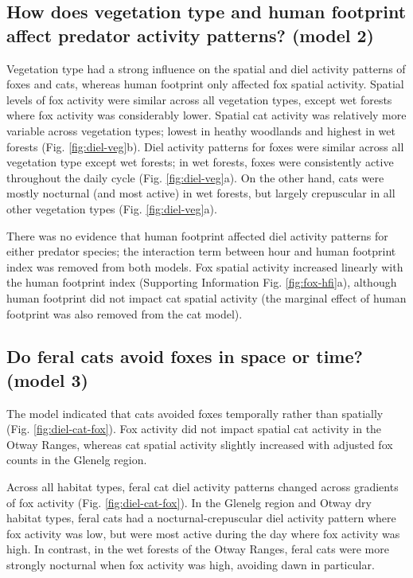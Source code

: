 \documentclass[preprint, 3p, authoryear]{elsarticle} %
\begin{document}
\hypertarget{how-does-vegetation-type-and-human-footprint-affect-predator-activity-patterns-model-2-1}{%
\subsection{How does vegetation type and human footprint affect predator activity patterns? (model 2)}\label{how-does-vegetation-type-and-human-footprint-affect-predator-activity-patterns-model-2-1}}

Vegetation type had a strong influence on the spatial and diel activity patterns of foxes and cats, whereas human footprint only affected fox spatial activity. Spatial levels of fox activity were similar across all vegetation types, except wet forests where fox activity was considerably lower. Spatial cat activity was relatively more variable across vegetation types; lowest in heathy woodlands and highest in wet forests (Fig. \ref{fig:diel-veg}b). Diel activity patterns for foxes were similar across all vegetation type except wet forests; in wet forests, foxes were consistently active throughout the daily cycle (Fig. \ref{fig:diel-veg}a). On the other hand, cats were mostly nocturnal (and most active) in wet forests, but largely crepuscular in all other vegetation types (Fig. \ref{fig:diel-veg}a).

There was no evidence that human footprint affected diel activity patterns for either predator species; the interaction term between hour and human footprint index was removed from both models. Fox spatial activity increased linearly with the human footprint index (Supporting Information Fig. \ref{fig:fox-hfi}a), although human footprint did not impact cat spatial activity (the marginal effect of human footprint was also removed from the cat model).

\hypertarget{do-feral-cats-avoid-foxes-in-space-or-time-model-3-1}{%
\subsection{Do feral cats avoid foxes in space or time? (model 3)}\label{do-feral-cats-avoid-foxes-in-space-or-time-model-3-1}}

The model indicated that cats avoided foxes temporally rather than spatially (Fig. \ref{fig:diel-cat-fox}). Fox activity did not impact spatial cat activity in the Otway Ranges, whereas cat spatial activity slightly increased with adjusted fox counts in the Glenelg region.

Across all habitat types, feral cat diel activity patterns changed across gradients of fox activity (Fig. \ref{fig:diel-cat-fox}). In the Glenelg region and Otway dry habitat types, feral cats had a nocturnal-crepuscular diel activity pattern where fox activity was low, but were most active during the day where fox activity was high. In contrast, in the wet forests of the Otway Ranges, feral cats were more strongly nocturnal when fox activity was high, avoiding dawn in particular.
\end{document}
